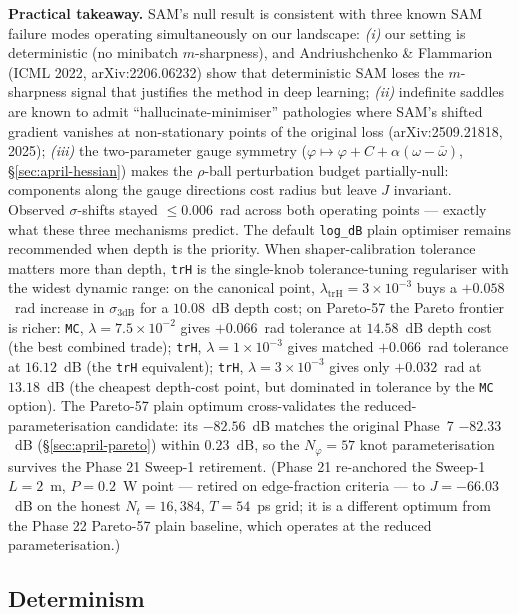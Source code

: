 \documentclass[12pt,a4paper]{article}
\theoremstyle{definition}
\begin{document}
\begin{advisory}
\textbf{Practical takeaway.} SAM's null result is consistent with
three known SAM failure modes operating simultaneously on our
landscape:
\emph{(i)} our setting is deterministic (no minibatch
$m$-sharpness), and Andriushchenko \& Flammarion (ICML 2022,
arXiv:2206.06232) show that deterministic SAM loses the
$m$-sharpness signal that justifies the method in deep learning;
\emph{(ii)} indefinite saddles are known to admit
``hallucinate-minimiser'' pathologies where SAM's shifted gradient
vanishes at non-stationary points of the original loss
(arXiv:2509.21818, 2025); \emph{(iii)} the two-parameter gauge
symmetry ($\varphi \mapsto \varphi + C + \alpha(\omega -
\bar\omega)$, \S\ref{sec:april-hessian}) makes the $\rho$-ball
perturbation budget partially-null: components along the gauge
directions cost radius but leave $J$ invariant. Observed
$\sigma$-shifts stayed $\leq 0.006$~rad across both operating
points --- exactly what these three mechanisms predict. The default
\texttt{log\_dB} plain optimiser remains recommended when depth is the
priority. When shaper-calibration tolerance matters more than depth,
\texttt{trH} is the single-knob tolerance-tuning regulariser with the
widest dynamic range: on the canonical point, $\lambda_{\text{trH}}{=}3\times10^{-3}$
buys a $+0.058$~rad increase in $\sigma_{3\text{dB}}$ for a $10.08$~dB
depth cost; on Pareto-57 the Pareto frontier is richer:
\texttt{MC}, $\lambda{=}7.5\times10^{-2}$ gives $+0.066$~rad tolerance
at $14.58$~dB depth cost (the best combined trade);
\texttt{trH}, $\lambda{=}1\times10^{-3}$ gives matched $+0.066$~rad
tolerance at $16.12$~dB (the \texttt{trH} equivalent);
\texttt{trH}, $\lambda{=}3\times10^{-3}$ gives only
$+0.032$~rad at $13.18$~dB (the cheapest depth-cost point, but
dominated in tolerance by the \texttt{MC} option). The Pareto-57 plain optimum cross-validates
the reduced-parameterisation candidate: its $-82.56$~dB matches the
original Phase~7 $-82.33$~dB (§\ref{sec:april-pareto}) within $0.23$~dB,
so the $N_\varphi{=}57$ knot parameterisation survives the Phase 21
Sweep-1 retirement. (Phase 21 re-anchored the Sweep-1 $L{=}2$~m,
$P{=}0.2$~W point --- retired on edge-fraction criteria --- to
$J = -66.03$~dB on the honest $N_t{=}16{,}384$, $T{=}54$~ps grid;
it is a different optimum from the Phase 22 Pareto-57 plain
baseline, which operates at the reduced parameterisation.)
\end{advisory}

\subsection{Determinism}
\label{sec:april-det}
\end{document}
